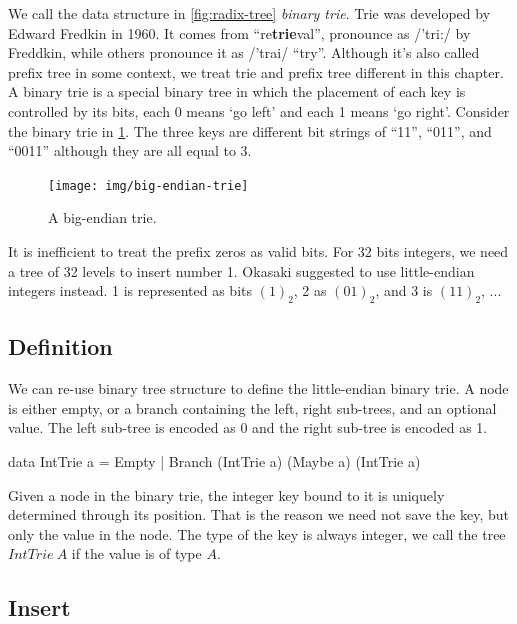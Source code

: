 \documentclass[b5paper]{article}
\begin{document}
We call the data structure in \cref{fig:radix-tree} \emph{binary trie}. Trie was developed by Edward Fredkin in 1960. It comes from ``re\textbf{trie}val'', pronounce as /'tri:/ by Freddkin, while others pronounce it as /'trai/ ``try''\cite{wiki-trie}. Although it's also called prefix tree in some context, we treat trie and prefix tree different in this chapter. A binary trie is a special binary tree in which the placement of each key is controlled by its bits, each 0 means `go left' and each 1 means `go right'\cite{okasaki-int-map}. Consider the binary trie in \cref{fig:big-endian-trie}. The three keys are different bit strings of ``11'', ``011'', and ``0011'' although they are all equal to 3.

\begin{figure}[htbp]
  \centering
  \texttt{[image: img/big-endian-trie]}
  \caption{A big-endian trie.}
  \label{fig:big-endian-trie}
\end{figure}

It is inefficient to treat the prefix zeros as valid bits. For 32 bits integers, we need a tree of 32 levels to insert number 1. Okasaki suggested to use little-endian integers instead\cite{okasaki-int-map}. 1 is represented as bits $(1)_2$, 2 as $(01)_2$, and 3 is $(11)_2$, ...

\subsection{Definition}
We can re-use binary tree structure to define the little-endian binary trie. A node is either empty, or a branch containing the left, right sub-trees, and an optional value. The left sub-tree is encoded as 0 and the right sub-tree is encoded as 1.

\lstset{frame = single}
\begin{Haskell}
data IntTrie a = Empty | Branch (IntTrie a) (Maybe a) (IntTrie a)
\end{Haskell}

Given a node in the binary trie, the integer key bound to it is uniquely determined through its position. That is the reason we need not save the key, but only the value in the node. The type of the key is always integer, we call the tree $IntTrie\ A$ if the value is of type $A$.

\subsection{Insert}
\end{document}
